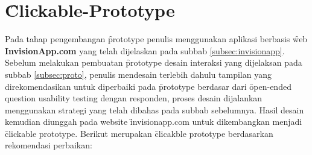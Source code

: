 \section{\f{Clickable-Prototype}}
Pada tahap pengembangan \f{prototype} penulis menggunakan aplikasi berbasis \f{web} \textbf{InvisionApp.com} yang telah dijelaskan pada subbab \ref{subsec:invisionapp}. Sebelum melakukan pembuatan \f{prototype} desain interaksi yang dijelaksan pada subbab \ref{subsec:proto}, penulis mendesain terlebih dahulu tampilan yang direkomendasikan untuk diperbaiki pada \f{prototype} berdasar dari \f{open-ended question usability testing} dengan responden, proses desain dijalankan menggunakan strategi yang telah dibahas pada subbab sebelumnya. Hasil desain kemudian diunggah pada website \f{invisionapp.com} untuk dikembangkan menjadi \f{clickable prototype}. Berikut merupakan \f{clicakble prototype} berdasarkan rekomendasi perbaikan:

